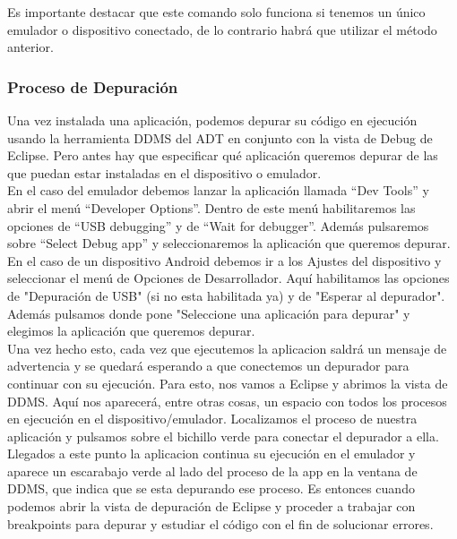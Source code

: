  	 Es importante destacar que este comando solo funciona si tenemos un único emulador o dispositivo conectado, de lo contrario habrá que utilizar el método anterior. \\[.2cm]

    
    		\subsubsection{Proceso de Depuración} \label{sssec:debug}
    
    Una vez instalada una aplicación, podemos depurar su código en ejecución usando la herramienta DDMS del ADT en conjunto con la vista de Debug de Eclipse. Pero antes hay que especificar qué aplicación queremos depurar de las que puedan estar instaladas en el dispositivo o emulador. \\[.2cm]

En el caso del emulador debemos lanzar la aplicación llamada “Dev Tools” y abrir el menú “Developer Options”. Dentro de este menú habilitaremos las opciones de “USB debugging” y de  “Wait for debugger”. Además pulsaremos sobre “Select Debug app” y seleccionaremos la aplicación que queremos depurar. \\[.2cm]

En el caso de un dispositivo Android debemos ir a los Ajustes del dispositivo y seleccionar el menú de Opciones de Desarrollador. Aquí habilitamos las opciones de "Depuración de USB"  (si no esta habilitada ya) y de "Esperar al depurador". Además pulsamos donde pone "Seleccione una aplicación para depurar" y elegimos la aplicación que queremos depurar. \\[.2cm]

Una vez hecho esto, cada vez que ejecutemos la aplicacion saldrá un mensaje de advertencia y se quedará esperando a que conectemos un depurador para continuar con su ejecución. Para esto, nos vamos a Eclipse y abrimos la vista de DDMS. Aquí nos aparecerá, entre otras cosas, un espacio con todos los procesos en ejecución en el dispositivo/emulador. Localizamos el proceso de nuestra aplicación y pulsamos sobre el bichillo verde para conectar el depurador a ella. Llegados a este punto la aplicacion continua su ejecución en el emulador y aparece un escarabajo verde al lado del proceso de la app en la ventana de DDMS, que indica que se esta depurando ese proceso. Es entonces cuando podemos abrir la vista de depuración de Eclipse y proceder a trabajar con breakpoints para depurar y estudiar el código con el fin de solucionar errores.

